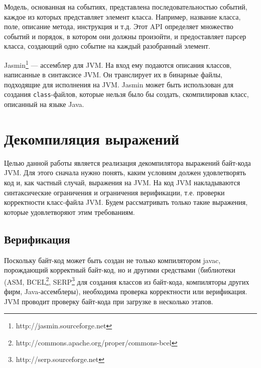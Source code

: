 Модель, основанная на событиях, представлена последовательностью событий, каждое из которых представляет  элемент класса. Например, название класса, поле, описание метода, инструкция и т.д. Этот API определяет множество событий и порядок, в котором они должны произойти, и предоставляет парсер класса, создающий одно событие на каждый разобранный элемент.



Jasmin\footnote{http://jasmin.sourceforge.net} --- ассемблер для JVM. На вход ему подаются описания классов, написанные в синтаксисе JVM. Он транслирует их в бинарные файлы, подходящие для исполнения на JVM. 
Jasmin может быть использован для создания \texttt{class}-файлов, которые нельзя было бы создать, скомпилировав класс, описанный на языке Java.

\section{Декомпиляция выражений}

Целью данной работы является реализация декомпилятора выражений байт-кода JVM. Для этого сначала нужно понять, каким условиям должен удовлетворять код и, как частный случай, выражения на JVM. На код JVM накладываются синтаксические ограничения и ограничения верификации, т.е. проверки корректности класс-файла JVM. Будем рассматривать только такие выражения, которые удовлетворяют этим требованиям.

\subsection{Верификация}
Поскольку байт-код может быть создан не только компилятором javac, порождающий корректный байт-код, но и   другими средствами (библиотеки (ASM, BCEL\footnote{http://commons.apache.org/proper/commons-bcel}, 
SERP\footnote{http://serp.sourceforge.net} для создания классов из байт-кода, компиляторы других фирм, Java-ассемблеры), необходима проверка корректности или верификация. JVM проводит проверку байт-кода при загрузке в несколько этапов. 

